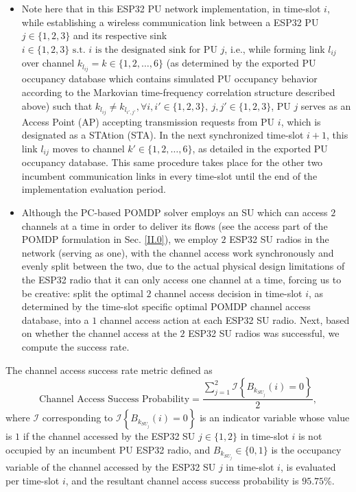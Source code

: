 \documentclass[12pt, draftcls, onecolumn]{IEEEtran}
\begin{document}
\begin{itemize}
    \item Note here that in this ESP32 PU network implementation, in time-slot $i$, while establishing a wireless communication link between a ESP32 PU $j{\in}\{1,2,3\}$ and its respective sink $i{\in}\{1,2,3\}\text{ s.t. }i\text{ is the designated sink for PU }j$, i.e., while forming link $l_{ij}$ over channel $k_{l_{ij}}{=}k{\in}\{1,2,\dots,6\}$ (as determined by the exported PU occupancy database which contains simulated PU occupancy behavior according to the Markovian time-frequency correlation structure described above) such that $k_{l_{ij}}{\neq}k_{l_{i',j'}},{\forall}i,i'{\in}\{1,2,3\},\ j,j'{\in}\{1,2,3\}$, PU $j$ serves as an Access Point (AP) accepting transmission requests from PU $i$, which is designated as a STAtion (STA). In the next synchronized time-slot $i+1$, this link $l_{ij}$ moves to channel $k'{\in}\{1,2,\dots,6\}$, as detailed in the exported PU occupancy database. This same procedure takes place for the other two incumbent communication links in every time-slot until the end of the implementation evaluation period.
    \item Although the PC-based POMDP solver employs an SU which can access $2$ channels at a time in order to deliver its flows (see the access part of the POMDP formulation in Sec. \ref{II.0}), we employ $2$ ESP32 SU radios in the network (serving as one), with the channel access work synchronously and evenly split between the two, due to the actual physical design limitations of the ESP32 radio that it can only access one channel at a time, forcing us to be creative: split the optimal $2$ channel access decision in time-slot $i$, as determined by the time-slot specific optimal POMDP channel access database, into a $1$ channel access action at each ESP32 SU radio. Next, based on whether the channel access at the $2$ ESP32 SU radios was successful, we compute the success rate.
\end{itemize}
The channel access success rate metric defined as
\begin{equation}\label{C.I}
    \text{Channel Access Success Probability}=\frac{\sum_{j=1}^{2}\mathcal{I}\left\{B_{k_{SU_{j}}}(i)=0\right\}}{2},
\end{equation}
where $\mathcal{I}$ corresponding to $\mathcal{I}\left\{B_{k_{SU_{j}}}(i)=0\right\}$ is an indicator variable whose value is $1$ if the channel accessed by the ESP32 SU $j{\in}\{1,2\}$ in time-slot $i$ is not occupied by an incumbent PU ESP32 radio, and $B_{k_{SU_{j}}}{\in}\{0,1\}$ is the occupancy variable of the channel accessed by the ESP32 SU $j$ in time-slot $i$, is evaluated per time-slot $i$, and the resultant channel access success probability is $95.75$\%.
\end{document}
